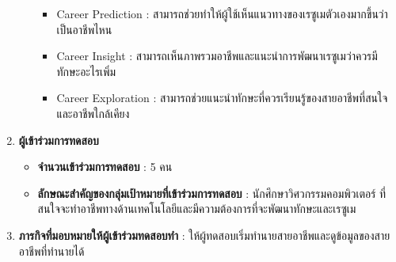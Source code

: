 \begin{enumerate}
\begin{itemize}
\begin{itemize}
                        \item Career Prediction : สามารถช่วยทำให้ผู้ใช้เห็นแนวทางของเรซูเมตัวเองมากขึ้นว่าเป็นอาชีพไหน
                        \item Career Insight : สามารถเห็นภาพรวมอาชีพและแนะนำการพัฒนาเรซูเมว่าควรมีทักษะอะไรเพิ่ม
                        \item Career Exploration : สามารถช่วยแนะนำทักษะที่ควรเรียนรู้ของสายอาชีพที่สนใจและอาชีพใกล้เคียง
                    \end{itemize}
          \end{itemize}
    \item \textbf{ผู้เข้าร่วมการทดสอบ}
          \begin{itemize}
              \item \textbf{จำนวนเข้าร่วมการทดสอบ} : 5 คน
              \item \textbf{ลักษณะสำคัญของกลุ่มเป้าหมายที่เข้าร่วมการทดสอบ} : นักศึกษาวิศวกรรมคอมพิวเตอร์ ที่สนใจจะทำอาชีพทางด้านเทคโนโลยีและมีความต้องการที่จะพัฒนาทักษะและเรซูเม
          \end{itemize}
    \item \textbf{ภารกิจที่มอบหมายให้ผู้เข้าร่วมทดสอบทำ} : ให้ผู้ทดสอบเริ่มทำนายสายอาชีพและดูข้อมูลของสายอาชีพที่ทำนายได้
\end{enumerate}
